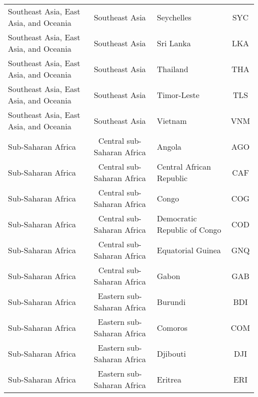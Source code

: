 \begin{landscape}
\begin{longtable}{|p{6cm}|c|p{5cm}|c|}
           Southeast Asia, East Asia, and Oceania &               Southeast Asia &                                        Seychelles &  SYC \\
           Southeast Asia, East Asia, and Oceania &               Southeast Asia &                                         Sri Lanka &  LKA \\
           Southeast Asia, East Asia, and Oceania &               Southeast Asia &                                          Thailand &  THA \\
           Southeast Asia, East Asia, and Oceania &               Southeast Asia &                                       Timor-Leste &  TLS \\
           Southeast Asia, East Asia, and Oceania &               Southeast Asia &                                           Vietnam &  VNM \\
                               Sub-Saharan Africa &   Central sub-Saharan Africa &                                            Angola &  AGO \\
                               Sub-Saharan Africa &   Central sub-Saharan Africa &                          Central African Republic &  CAF \\
                               Sub-Saharan Africa &   Central sub-Saharan Africa &                                             Congo &  COG \\
                               Sub-Saharan Africa &   Central sub-Saharan Africa &    \raggedright                  Democratic Republic of Congo &  COD \\
                               Sub-Saharan Africa &   Central sub-Saharan Africa &                                 Equatorial Guinea &  GNQ \\
                               Sub-Saharan Africa &   Central sub-Saharan Africa &                                             Gabon &  GAB \\
                               Sub-Saharan Africa &   Eastern sub-Saharan Africa &                                           Burundi &  BDI \\
                               Sub-Saharan Africa &   Eastern sub-Saharan Africa &                                           Comoros &  COM \\
                               Sub-Saharan Africa &   Eastern sub-Saharan Africa &                                          Djibouti &  DJI \\
                               Sub-Saharan Africa &   Eastern sub-Saharan Africa &                                           Eritrea &  ERI \\

\end{longtable}
\end{landscape}
